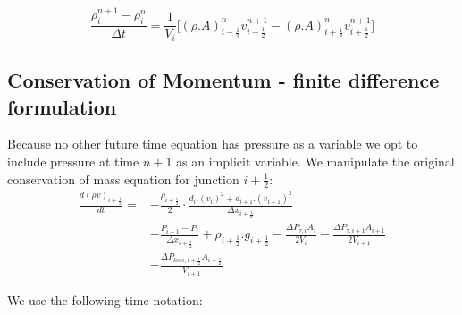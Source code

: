 \documentclass[11pt,letterpaper,titlepage]{article}
\newcommand{\half}{\frac{1}{2}}
\begin{document}
\begin{equation}
\frac{\rho_i^{n+1} - \rho_i^{n}}{\Delta t} = \frac{1}{V_i}\biggr[ (\rho.A)_{i-\half}^{n}v_{i-\half}^{n+1}-(\rho.A)_{i+\half}^{n} v_{i+\half}^{n+1} \biggr]
\end{equation}




\subsection{Conservation of Momentum - finite difference formulation}
Because no other future time equation has pressure as a variable we opt to include pressure at time $n+1$ as an implicit variable. We manipulate the original conservation of mass equation for junction $i+\half$:
\begin{equation*}
\begin{aligned}
\frac{d(\rho v)_{i+\half}}{dt}=&-\frac{\rho_{i+\half}}{2}\cdot\frac{d_i.(v_{i})^2+d_{i+1}.(v_{i+1})^2}{\Delta x_{i+\half}} \\
&-\frac{P_{i+1}-P_i}{\Delta x_{i+\half}} + \rho_{i+\half}.g_{i+\half}-\frac{\Delta P_{\tau,i}A_i}{2V_i}-\frac{\Delta P_{\tau,i+1}A_{i+1}}{2V_{i+1}} \\
&-\frac{\Delta P_{loss,i+\half}A_{i+\half}}{V_{i+1}}
\end{aligned}
\end{equation*}

\noindent We use the following time notation:
\end{document}
